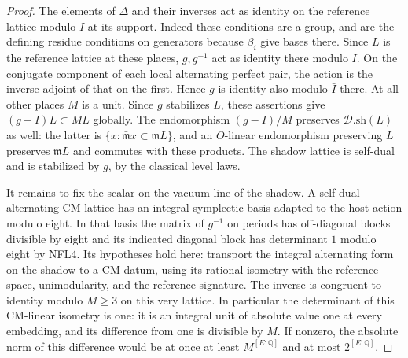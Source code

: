 \begin{proof}
The elements of $\Delta$ and their inverses act as identity on the
reference lattice modulo $I$ at its support. Indeed these conditions
are a group, and are the defining residue conditions on generators
because $\beta_i$ give bases there. Since $L$ is the reference
lattice at these places, $g,g^{-1}$ act as identity there modulo
$I$. On the conjugate component of each local alternating perfect
pair, the action is the inverse adjoint of that on the first.
Hence $g$ is identity also modulo $\bar I$ there. At all other
places $M$ is a unit. Since $g$ stabilizes $L$, these assertions
give $(g-I)L\subset ML$ globally. The endomorphism
$(g-I)/M$ preserves $\mathcal D.\mathrm{sh}(L)$ as well:
the latter is $\{x:\bar{\mathfrak m}x\subset\mathfrak m L\}$,
and an $O$-linear endomorphism preserving $L$ preserves
$\mathfrak m L$ and commutes with these products. The shadow lattice is self-dual and is
stabilized by $g$, by the classical level laws.

It remains to fix the scalar on the vacuum line of the shadow.
A self-dual alternating CM lattice has an integral symplectic
basis adapted to the host action modulo eight. In that basis
the matrix of $g^{-1}$ on periods has off-diagonal blocks divisible
by eight and its indicated diagonal block has determinant $1$
modulo eight by NFL4. Its hypotheses hold here: transport the
integral alternating form on the shadow to a CM datum, using its
rational isometry with the reference space, unimodularity, and
the reference signature. The inverse is congruent to identity
modulo $M\ge3$ on this very lattice. In particular the determinant
of this CM-linear isometry is one: it is an integral unit of
absolute value one at every embedding, and its difference from one
is divisible by $M$. If nonzero, the absolute norm of this
difference would be at once at least $M^{[E:\mathbb Q]}$ and
at most $2^{[E:\mathbb Q]}$.


\end{proof}
